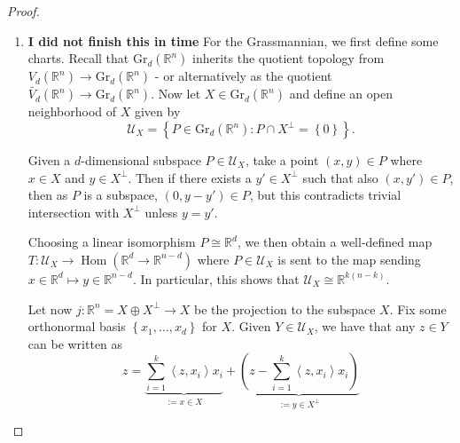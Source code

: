 \documentclass[reqno]{amsart}
\theoremstyle{definition}
\theoremstyle{remark}
\DeclareMathOperator{\Hom}{Hom}
\begin{document}
\begin{proof}
\begin{enumerate}
\[             \ldots, \alpha_{1n},
         \alpha_{21}, \alpha_{22}, \ldots, 
 \alpha_{n(n-1)}, \alpha_{nn} \right) \in 
\mathbb{R}^{n^2}\]
Since the determinant is continuous, we take a chart
about $\left( \alpha_{ij} \right) $ to be
the preimage of some open
neighborhood of its identified point in
$\mathbb{R}^{n^2}$ such that the determinant is
nonzero in this neighborhood. But since
the same chart map is used for every chart
domain, the transition maps will all be identity maps
on some open subsets of
$\mathbb{R}^{n^2}$ which are smooth, hence
this atlas is trivially a smooth atlas.
\item 
    \textbf{I did not finish this in time}
For the Grassmannian, we first define some charts.
Recall that $\text{Gr}_d \left( \mathbb{R}^{n} \right)$ inherits
the quotient topology from
$V_d \left( \mathbb{R}^{n} \right) \to 
\text{Gr}_d \left( \mathbb{R}^{n} \right) $ - or alternatively
as the quotient $\tilde{V_d}(\mathbb{R}^{n}) \to 
\text{Gr}_d \left( \mathbb{R}^{n} \right) $.
Now let $X \in 
\text{Gr}_d\left( \mathbb{R}^{n} \right)$
and define an open neighborhood
of $X$ given by
\[
\mathcal{U}_X = \left\{ P \in \text{Gr}_d(\mathbb{R}^{n})
\colon P \cap X^{\perp} = \left\{ 0 \right\} \right\} .
\] 

Given a $d$-dimensional subspace
$P \in \mathcal{U}_X$, take a point
$\left( x,y \right) \in 
P$ where $x \in X$ and $y \in X^{\perp}$. Then
if there exists a $y' \in X^{\perp}$ such that also
$\left( x,y' \right) \in P$, then
as $P$ is a subspace, $\left( 0, y-y' \right) 
\in P$, but this contradicts trivial intersection with
$X^{\perp}$ unless $y = y'$. 

Choosing a linear isomorphism
$P \cong \mathbb{R}^{d}$, we then obtain a 
well-defined map
$T \colon \mathcal{U}_X \to \Hom \left( \mathbb{R}^{d}
\to \mathbb{R}^{n-d} \right) $ where
$P \in \mathcal{U}_X$ is sent to
the map sending $x \in \mathbb{R}^{d} \mapsto y
\in \mathbb{R}^{n-d}$. In particular, this
shows that
$\mathcal{U}_X \cong \mathbb{R}^{k(n-k)}$.

Let now $j \colon \mathbb{R}^{n} = 
X \oplus X^{\perp} \to X$ be the projection
to the subspace $X$. Fix some orthonormal basis
$\left\{ x_1, \ldots, x_d \right\} $ for
$X$. Given $Y \in \mathcal{U}_X$, 
we have that any $z \in Y$ can be written as
\[
    z = \underbrace{\sum_{i=1}^{k} \left<z , x_i \right> x_i}_{:=x
    \in X}+ 
\underbrace{\left( z - \sum_{i=1}^{k} \left<z, x_i  \right> x_i
\right)}_{:=y \in X^{\perp}}
\] 

        \end{enumerate}
    \end{proof}
\end{document}
